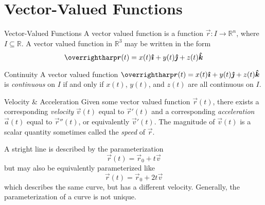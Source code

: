 \documentclass[../main.tex]{subfiles}
\begin{document}
        \section{Vector-Valued Functions}
        \begin{definition}{Vector-Valued Functions}{}
                A vector valued function is a function \(\vec{r}:I \to \mathbb{R}^n\), where \(I \subseteq \mathbb{R}\). A vector valued function in \(\mathbb{R}^3\) may be written in the form
                \[
                \vec{r}(t)=x(t)\i + y(t)\j + z(t)\k
                \]
        \end{definition}
        \begin{definition}{Continuity}{}
                A vector valued function \(\vec{r}(t)=x(t)\i + y(t)\j + z(t)\k
\) is \emph{continuous} on \(I\) if and only if \(x(t)\), \(y(t)\), and \(z(t)\) are all continuous on \(I\).
        \end{definition}
        \begin{definition}{Velocity \& Acceleration}{}
                Given some vector valued function \(\vec{r}(t)\), there exists a corresponding \emph{velocity} \(\vec{v}(t)\) equal to \(\vec{r}'(t)\) and a corresponding \emph{acceleration} \(\vec{a}(t)\) equal to \(\vec{r}''(t)\), or equivalently \(\vec{v}'(t)\). The magnitude of \(\vec{v}(t)\) is a scalar quantity sometimes called the \emph{speed} of \(\vec{r}\).
        \end{definition}
        A stright line is described by the parameterization
        \begin{equation*}
                \vec{r}(t)=\vec{r}_0 + t\vec{v}
        \end{equation*}
        but may also be equivalently parameterized like
        \begin{equation*}
                \vec{r}(t)=\vec{r}_0 + 2t\vec{v}
        \end{equation*}
        which describes the same curve, but has a different velocity. Generally, the parameterization of a curve is not unique.
        
\end{document}
